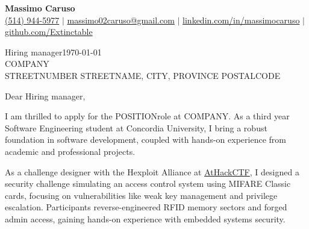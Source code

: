 \documentclass[10pt]{article}
\begin{document}
\newcommand{\fullname}{Massimo Caruso}
\newcommand{\phone}{(514) 944-5977}
\newcommand{\email}{massimo02caruso@gmail.com}
\newcommand{\linkedin}{linkedin.com/in/massimocaruso}
\newcommand{\github}{github.com/Extinctable}

\newcommand*{\hiringManager}{Hiring manager}
\newcommand*{\company}{COMPANY}
\newcommand*{\address}{STREETNUMBER STREETNAME, CITY, PROVINCE POSTALCODE}

\newcommand*{\position}{POSITION}
\newcommand*{\companyDetails}{COMPANYDETAILS}
\newcommand*{\positionDetails}{POSITIONDETAILS}

\begin{center}
    {\Huge \textbf{\fullname}} \\
    \vspace{1mm}
    {\small 
    \faPhone \hspace{0mm} \href{tel:+15149445977}{\phone} $\vert$ 
    \faEnvelope \hspace{0mm} \href{mailto:massimo02caruso@gmail.com}{\email} $\vert$ 
    \faLinkedin \hspace{0mm} \href{https://linkedin.com/in/massimocaruso}{\linkedin} $\vert$ 
    \faGithub \hspace{0mm} \href{https://github.com/Extinctable}{\github}
    }
\end{center}


\vspace{1.5em}
\hiringManager \hfill \today \\
\company \\
\address 


\vspace{1.5em}
Dear \hiringManager,

I am thrilled to apply for the \position \space role at \company. As a third year Software Engineering student at Concordia University, I bring a robust foundation in software development, coupled with hands-on experience from academic and professional projects.

As a challenge designer with the Hexploit Alliance at \href{https://www.athackctf.com}{AtHackCTF}, I designed a security challenge simulating an access control system using MIFARE Classic cards, focusing on vulnerabilities like weak key management and privilege escalation. Participants reverse-engineered RFID memory sectors and forged admin access, gaining hands-on experience with embedded systems security.
\end{document}
